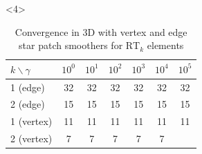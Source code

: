 \documentclass[presentation,aspectratio=43, 10pt]{beamer}
\newcommand{\convexpath}[2]{
  [
  create hullcoords/.code={
    \global\edef\namelist{#1}
    \foreach [count=\counter] \nodename in \namelist {
      \global\edef\numberofnodes{\counter}
      \coordinate (hullcoord\counter) at (\nodename);
    }
    \coordinate (hullcoord0) at (hullcoord\numberofnodes);
    \pgfmathtruncatemacro\lastnumber{\numberofnodes+1}
    \coordinate (hullcoord\lastnumber) at (hullcoord1);
  },
  create hullcoords
  ]
  ($(hullcoord1)!#2!-90:(hullcoord0)$)
  \foreach [
  evaluate=\currentnode as \previousnode using \currentnode-1,
  evaluate=\currentnode as \nextnode using \currentnode+1
  ] \currentnode in {1,...,\numberofnodes} {
    let \p1 = ($(hullcoord\currentnode) - (hullcoord\previousnode)$),
    \n1 = {atan2(\y1,\x1) + 90},
    \p2 = ($(hullcoord\nextnode) - (hullcoord\currentnode)$),
    \n2 = {atan2(\y2,\x2) + 90},
    \n{delta} = {Mod(\n2-\n1,360) - 360}
    in
    {arc [start angle=\n1, delta angle=\n{delta}, radius=#2]}
    -- ($(hullcoord\nextnode)!#2!-90:(hullcoord\currentnode)$)
  }
}
\begin{document}
\begin{frame}[fragile, t]
\begin{onlyenv}
\begin{columns}[T]
\begin{column}{0.4\textwidth}
\begin{center}
        \end{center}
      \end{column}
    \end{columns}
  \end{onlyenv}
  \begin{onlyenv}<4>
    \begin{table}
      \centering
      {\footnotesize
      \begin{tabular}{l|cccccc}
        $k\backslash \gamma$ & $10^0$ & $10^1$ & $10^2$ & $10^3$ & $10^4$ & $10^5$ \\
        \toprule
        1 (edge)             & 32     & 32     & 32     & 32     & 32     & 32     \\
        2 (edge)             & 15     & 15     & 15     & 15     & 15     & 15     \\
        \midrule
        1 (vertex)           & 11     & 11     & 11     & 11     & 11     & 11     \\
        2 (vertex)           & 7      & 7      & 7      & 7      & 7
      \end{tabular}
      \caption{Convergence in 3D with vertex and edge star patch
        smoothers for $\text{RT}_k$ elements}
      }
    \end{table}
  \end{onlyenv}
\end{frame}
\end{document}
